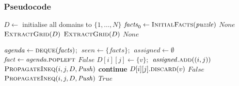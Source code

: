 \subsubsection{Pseudocode}

\begin{algorithm}[H]
\caption{MAC Master Coordinator}
\label{alg:mac-solve}
\begin{algorithmic}[1]
    \State $D \gets$ initialise all domains to $\{1,\ldots,N\}$
    \State $\mathit{facts}_0 \gets \Call{InitialFacts}{\mathit{puzzle}}$
        \State \Return $\mathit{None}$ 
    \EndIf
        \State \Return $\Call{ExtractGrid}{D}$
    \EndIf
        \State \Return $\Call{ExtractGrid}{D}$
    \EndIf
    \State \Return $\mathit{None}$
\EndFunction
\end{algorithmic}
\end{algorithm}

\begin{algorithm}[H]
\caption{FC Engine --- Modus Ponens on Domain Facts}
\label{alg:mac-fc}
\begin{algorithmic}[1]
    \State $\mathit{agenda} \gets \Call{deque}{\mathit{facts}}$;
           $\;\mathit{seen} \gets \{\mathit{facts}\}$;
           $\;\mathit{assigned} \gets \emptyset$
        \State $\mathit{fact} \gets \mathit{agenda}.\Call{popleft}{}$
             \Return $\mathit{False}$
            \EndIf
                \State $D[i][j] \gets \{v\}$;
                       $\;\mathit{assigned}.\Call{add}{(i,j)}$
                 
                \EndFor
                 
                \EndFor
                \State $\Call{PropagateIneq}{i, j, D, \mathit{Push}}$
            \EndIf
             \textbf{continue} \EndIf
            \State $D[i][j].\Call{discard}{v}$
             \Return $\mathit{False}$
            \EndIf
                \State {}
            \EndIf
            \State $\Call{PropagateIneq}{i, j, D, \mathit{Push}}$
        \EndIf
    \EndWhile
    \State \Return $\mathit{True}$
\EndFunction
\end{algorithmic}
\end{algorithm}

